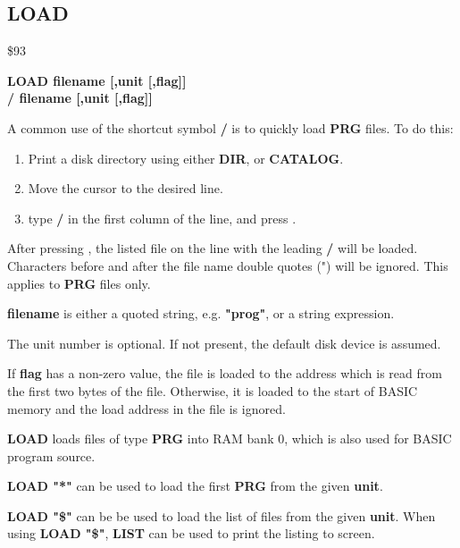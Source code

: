 
\newpage
\subsection{LOAD}
\begin{description}[leftmargin=2cm,style=nextline]
\item [Token:] \$93
\item [Format:] {\bf LOAD filename [,unit [,flag]]} \\
                {\bf / filename [,unit [,flag]]}
\item [Usage:]

   A common use of the shortcut symbol {\bf /} is to quickly load
   {\bf PRG} files. To do this:

    \begin{enumerate}
    \item Print a disk directory using either {\bf DIR}, or {\bf CATALOG}.
    \item Move the cursor to the desired line.
    \item type {\bf /} in the first column of the line, and press .
    \end{enumerate}
   After pressing , the listed file on the line with the leading {\bf /} will be loaded.
Characters before and after the file name double quotes (") will be ignored.
   This applies to {\bf PRG} files only.

   {\bf filename} is either a quoted string, e.g. {\bf "prog"}, or
   a string expression.

   The unit number is optional.
   If not present, the default disk device is assumed.

   If {\bf flag} has a non-zero value, the file is loaded to
   the address which is read from the first two bytes of the file.
   Otherwise, it is loaded to the start of BASIC memory and
   the load address in the file is ignored.

\item [Remarks:]
   {\bf LOAD} loads files of type {\bf PRG} into RAM bank 0,
   which is also used for BASIC program source.

   {\bf LOAD "*"} can be used to load the first {\bf PRG} from the
   given {\bf unit}.

   {\bf LOAD "\$"} can be be used to load
   the list of files from the given {\bf unit}. When using {\bf LOAD "\$"},
   {\bf LIST} can be used to print the listing to screen.


\end{description}
